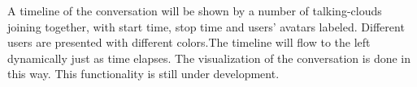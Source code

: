 \begin{itemize}
\begin{itemize}
        A timeline of the conversation will be shown by a number of
        talking-clouds joining together, with start time, stop time
        and users' avatars labeled. Different users are presented
        with different colors.The timeline will flow to the left dynamically
        just as time elapses. The visualization of the conversation is done
        in this way. This functionality is still under development.
    \end{itemize}

\end{itemize}
